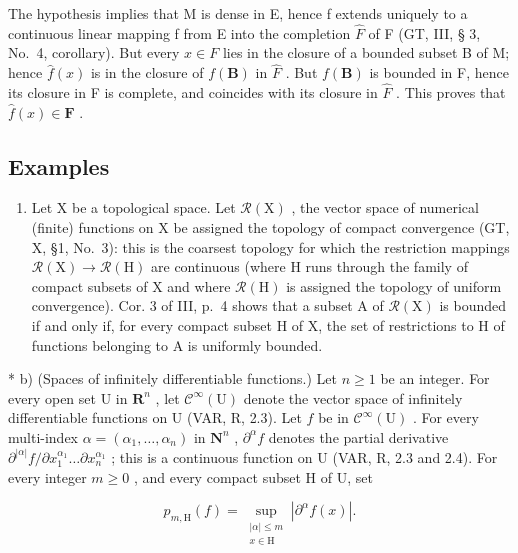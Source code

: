 The hypothesis implies that M is dense in E, hence f extends uniquely to a continuous linear mapping f from E into the completion \(\hat{F}\) of F (GT, III, § 3, No.~4, corollary). But every \(x \in F\) lies in the closure of a bounded subset B of M; hence \(\hat{f}(x)\) is in the closure of \(f(\mathbf{B})\) in \(\hat{F}\) . But \(f(\mathbf{B})\) is bounded in F, hence its closure in F is complete, and coincides with its closure in \(\hat{F}\) . This proves that \(\hat{f}(x) \in \mathbf{F}\) .

\subsection{Examples}

\begin{enumerate}
\def\labelenumi{\alph{enumi})}
\tightlist
\item
  Let X be a topological space. Let \(\mathcal{R}(\mathrm{X})\) , the vector space of numerical (finite) functions on X be assigned the topology of compact convergence (GT, X, §1, No.~3): this is the coarsest topology for which the restriction mappings \(\mathcal{R}(\mathrm{X}) \to \mathcal{R}(\mathrm{H})\) are continuous (where H runs through the family of compact subsets of X and where \(\mathcal{R}(\mathrm{H})\) is assigned the topology of uniform convergence). Cor. 3 of III, p.~4 shows that a subset A of \(\mathcal{R}(\mathrm{X})\) is bounded if and only if, for every compact subset H of X, the set of restrictions to H of functions belonging to A is uniformly bounded.
\end{enumerate}

* b) (Spaces of infinitely differentiable functions.) Let \(n \geqslant 1\) be an integer. For every open set U in \(\mathbf{R}^n\) , let \(\mathcal{C}^\infty(\mathrm{U})\) denote the vector space of infinitely differentiable functions on U (VAR, R, 2.3). Let \(f\) be in \(\mathcal{C}^\infty(\mathrm{U})\) . For every multi-index \(\alpha = (\alpha_1, \dots, \alpha_n)\) in \(\mathbf{N}^n\) , \(\partial^\alpha f\) denotes the partial derivative \(\partial^{|\alpha|} f / \partial x_1^{\alpha_1} \dots \partial x_n^{\alpha_1}\) ; this is a continuous function on U (VAR, R, 2.3 and 2.4). For every integer \(m \geqslant 0\) , and every compact subset H of U, set

\[
p_{m,\mathrm{H}}(f) = \sup_{\substack{|\alpha |\leqslant m\\ x\in \mathrm{H}}}\left|\partial^{\alpha}f(x)\right|.\tag{1}
\]

